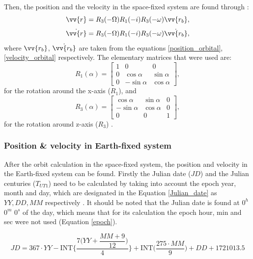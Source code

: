 Then, the position and the velocity in the space-fixed system are found through \cite{Montenbruck}:
\begin{equation}
\label{space-fixed}
\vv{r} = R_3 (-\Omega) R_1  (-i) R_3 (-\omega) \vv{r_{b}},
\end{equation}
\begin{equation}
\dot{\vv{r}} = R_3 (-\Omega) R_1  (-i) R_3 (-\omega) \dot{\vv{r_{b}}},
\end{equation}
where $\vv{r_{b}}$, $\dot{\vv{r_{b}}}$ are taken from the equations \ref{position_orbital}, \ref{velocity_orbital} respectively. The elementary matrices that were used are:
\begin{equation}
R_1(\alpha) = \begin{bmatrix} 1 & 0 & 0 \\ 0 & \cos{\alpha} & \sin{\alpha} \\ 0 & -\sin{\alpha} & \cos{\alpha} \end{bmatrix},
\end{equation}
for the rotation around the x-axis ($R_{1}$), and
\begin{equation}
\label{R3}
R_3(\alpha) = \begin{bmatrix} \cos{\alpha} & \sin{\alpha} & 0 \\ -\sin{\alpha} & \cos{\alpha} & 0 \\ 0 & 0 & 1 \end{bmatrix},
\end{equation}
for the rotation around z-axis ($R_{3}$) \cite{Montenbruck}.

\bigskip
\subsubsection{Position \& velocity in Earth-fixed system}
\bigskip

After the orbit calculation in the space-fixed system, the position and velocity in the Earth-fixed system can be found. Firstly the Julian date ($JD$) and the Julian centuries ($T_{UT1}$) need to be calculated by taking into account the epoch year, month and day, which are designated in the Equation \ref{Julian_date} as $YY, DD, MM$ respectively \cite{Vallado}. It should be noted that the Julian date is found at $0^{h}$ $0^{m}$ $0^{s}$ of the day, which means that for its calculation the epoch hour, min and sec were not used (Equation \ref{epoch}).

\begin{equation}
\label{Julian_date}
JD = 367 \cdot YY - \text{INT} \Bigg \{ \dfrac{7 \Big( YY + \dfrac{MM + 9}{12} \Big)}{4} \Bigg \} + \text{INT} \Big( \dfrac{275 \cdot MM}{9} \Big) + DD + 1721013.5
\end{equation}

